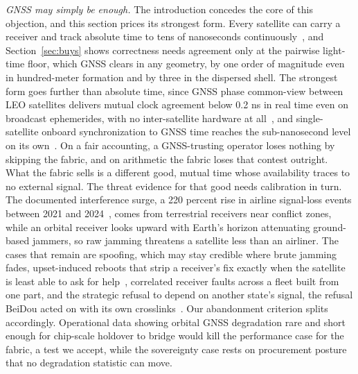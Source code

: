 \documentclass[twocolumn,10pt]{article}
\newcommand{\runin}[1]{\smallskip\noindent\textit{#1.}\hspace{0.6em}}
\begin{document}
\runin{GNSS may simply be enough}
The introduction concedes the core of this objection, and this section prices its strongest form. Every satellite can carry a receiver and track absolute time to tens of nanoseconds continuously~\cite{denby2020,pod}, and Section~\ref{sec:buys} shows correctness needs agreement only at the pairwise light-time floor, which GNSS clears in any geometry, by one order of magnitude even in hundred-meter formation and by three in the dispersed shell. The strongest form goes further than absolute time, since GNSS phase common-view between LEO satellites delivers mutual clock agreement below 0.2 ns in real time even on broadcast ephemerides, with no inter-satellite hardware at all~\cite{wang2024cv}, and single-satellite onboard synchronization to GNSS time reaches the sub-nanosecond level on its own~\cite{kunzi2022}. On a fair accounting, a GNSS-trusting operator loses nothing by skipping the fabric, and on arithmetic the fabric loses that contest outright. What the fabric sells is a different good, mutual time whose availability traces to no external signal. The threat evidence for that good needs calibration in turn. The documented interference surge, a 220 percent rise in airline signal-loss events between 2021 and 2024~\cite{gnssjam}, comes from terrestrial receivers near conflict zones, while an orbital receiver looks upward with Earth's horizon attenuating ground-based jammers, so raw jamming threatens a satellite less than an airliner. The cases that remain are spoofing, which may stay credible where brute jamming fades, upset-induced reboots that strip a receiver's fix exactly when the satellite is least able to ask for help~\cite{pfandzelter2023}, correlated receiver faults across a fleet built from one part, and the strategic refusal to depend on another state's signal, the refusal BeiDou acted on with its own crosslinks~\cite{li2025}. Our abandonment criterion splits accordingly. Operational data showing orbital GNSS degradation rare and short enough for chip-scale holdover to bridge would kill the performance case for the fabric, a test we accept, while the sovereignty case rests on procurement posture that no degradation statistic can move.
\end{document}
